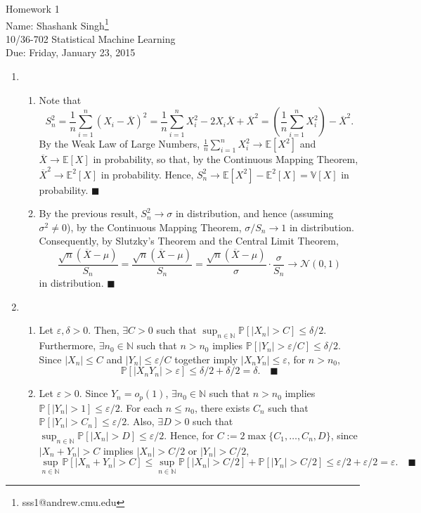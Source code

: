 \documentclass[11pt]{article}
\makeatletter
\newcommand{\myname}{Shashank Singh\footnote{sss1@andrew.cmu.edu}}
\newcommand{\myclass}{10/36-702 Statistical Machine Learning}
\newcommand{\myhwnum}{1}
\newcommand{\duedate}{Friday, January 23, 2015}
\renewcommand{\qed}{\quad \ensuremath{\blacksquare}}
\newcommand{\E}{\mathbb{E}} %
\newcommand{\pr}{\mathbb{P}} %
\newcommand{\Var}{\mathbb{V}} %
\newcommand{\N}{\mathbb{N}} %
\newcommand{\e}{\varepsilon} %
\newcommand{\ol}{\overline}
\makeatother
\begin{document}
\thispagestyle{plain}

{\Large Homework \myhwnum} \\
Name: \myname \\
\myclass \\
Due: \duedate

\begin{enumerate}
\item
\begin{enumerate}
\item Note that
\[S_n^2
    = \frac1n \sum_{i = 1}^n (X_i - \ol X)^2
    = \frac1n \sum_{i = 1}^n X_i^2 - 2X_i \ol X + \ol X^2
    = \left( \frac1n \sum_{i = 1}^n X_i^2 \right) - \ol X^2.
\]
By the Weak Law of Large Numbers, $\frac1n \sum_{i = 1}^n X_i^2 \to \E[X^2]$
and $\ol X \to \E[X]$ in probability, so that, by the Continuous Mapping
Theorem, $\ol X^2 \to \E^2[X]$ in probability. Hence,
$S_n^2 \to \E[X^2] - \E^2[X] = \Var[X]$ in probability. \qed

\item By the previous result, $S_n^2 \to \sigma$ in distribution, and hence
(assuming $\sigma^2 \neq 0$), by the Continuous Mapping Theorem,
$\sigma/S_n \to 1$ in distribution. Consequently, by Slutzky's Theorem and
the Central Limit Theorem,
\[\frac{\sqrt{n}(\ol X - \mu)}{S_n}
    = \frac{\sqrt{n}(\ol X - \mu)}{S_n}
    = \frac{\sqrt{n}(\ol X - \mu)}{\sigma} \cdot \frac{\sigma}{S_n}
    \to \mathcal{N}(0,1)
\]
in distribution. \qed
\end{enumerate}

\item
\begin{enumerate}
\item Let $\e, \delta > 0$. Then, $\exists C > 0$ such that
$\sup_{n \in \N} \pr[|X_n| > C] \leq \delta/2$. Furthermore,
$\exists n_0 \in \N$ such that $n > n_0$ implies
$\pr[|Y_n| > \e/C] \leq \delta/2$. Since $|X_n| \leq C$ and $|Y_n| \leq \e/C$
together imply $|X_nY_n| \leq \e$, for $n > n_0$, 
\[\pr[|X_nY_n| > \e] \leq \delta/2 + \delta/2 = \delta. \qed\]

\item Let $\e > 0$. Since $Y_n = o_p(1)$, $\exists n_0 \in \N$ such that
$n > n_0$ implies $\pr[|Y_n| > 1] \leq \e/2$. For each $n \leq n_0$, there
exists $C_n$ such that $\pr[|Y_n| > C_n] \leq \e/2$. Also, $\exists D > 0$ such
that $\sup_{n \in \N} \pr[|X_n| > D] \leq \e/2$. Hence, for
$C := 2\max\{C_1,\dots,C_n,D\}$, since $|X_n + Y_n| > C$ implies $|X_n| > C/2$
or $|Y_n| > C/2$,
\[\sup_{n \in \N} \pr[|X_n + Y_n| > C]
    \leq \sup_{n \in \N} \pr[|X_n| > C/2] + \pr[|Y_n| > C/2]
    \leq \e/2 + \e/2
    = \e. \qed
\]


\end{enumerate}
\end{enumerate}
\end{document}
